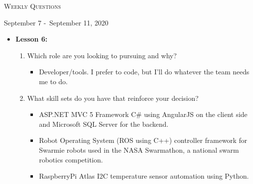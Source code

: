 \centerline{\LARGE\textsc{Weekly Questions}}
\centerline{September 7 -\ September 11, 2020}
\textbf{}
\begin{itemize}
  \item[] \textbf{\large Lesson 6:}
  \begin{enumerate}
    \item Which role are you looking to pursuing and why?
    \begin{itemize}
      \item Developer/tools. I prefer to code, but I'll do whatever
      the team needs me to do.
    \end{itemize}
    \item What skill sets do you have that reinforce your decision?
    \begin{itemize}
      \item ASP.NET MVC 5 Framework C\# using AngularJS on the client side and Microsoft SQL Server for the backend.
      \item Robot Operating System (ROS using C++) controller framework for Swarmie robots used in the NASA Swarmathon, 
      a national swarm robotics competition.
      \item RaspberryPi Atlas I2C temperature sensor automation using Python. 
    \end{itemize}
  \end{enumerate}
\end{itemize}